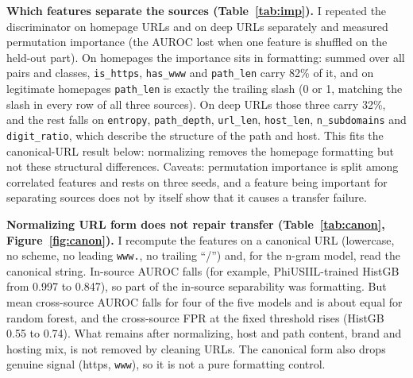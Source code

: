 \documentclass[10pt]{article}
\begin{document}
\begin{table}[t]
\centering
\caption{Source discriminator: AUROC of predicting the source from URL-only features within one class (HistGB, equal numbers per source, registered-domain-disjoint split, mean of three seeds).}
\label{tab:discr}

\end{table}

\textbf{Which features separate the sources (Table~\ref{tab:imp}).} I repeated the discriminator on homepage URLs and on deep URLs separately and measured permutation importance (the AUROC lost when one feature is shuffled on the held-out part). On homepages the importance sits in formatting: summed over all pairs and classes, \texttt{is\_https}, \texttt{has\_www} and \texttt{path\_len} carry 82\% of it, and on legitimate homepages \texttt{path\_len} is exactly the trailing slash (0 or 1, matching the slash in every row of all three sources). On deep URLs those three carry 32\%, and the rest falls on \texttt{entropy}, \texttt{path\_depth}, \texttt{url\_len}, \texttt{host\_len}, \texttt{n\_subdomains} and \texttt{digit\_ratio}, which describe the structure of the path and host. This fits the canonical-URL result below: normalizing removes the homepage formatting but not these structural differences. Caveats: permutation importance is split among correlated features and rests on three seeds, and a feature being important for separating sources does not by itself show that it causes a transfer failure.

\begin{table}[t]
\centering
\caption{Top two features (permutation importance) for telling the sources apart, within a class, on homepage URLs and on deep URLs. AUROC of the discriminator on that subset. n/a: PhiUSIIL has no deep legitimate URLs.}
\label{tab:imp}

\end{table}

\textbf{Normalizing URL form does not repair transfer (Table~\ref{tab:canon}, Figure~\ref{fig:canon}).} I recompute the features on a canonical URL (lowercase, no scheme, no leading \texttt{www.}, no trailing ``/'') and, for the n-gram model, read the canonical string. In-source AUROC falls (for example, PhiUSIIL-trained HistGB from 0.997 to 0.847), so part of the in-source separability was formatting. But mean cross-source AUROC falls for four of the five models and is about equal for random forest, and the cross-source FPR at the fixed threshold rises (HistGB 0.55 to 0.74). What remains after normalizing, host and path content, brand and hosting mix, is not removed by cleaning URLs. The canonical form also drops genuine signal (https, \texttt{www}), so it is not a pure formatting control.
\end{document}
